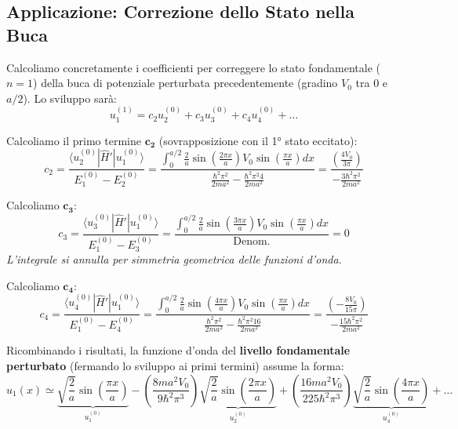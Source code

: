\documentclass[11pt, a4paper]{article}
\begin{document}
\subsection{Applicazione: Correzione dello Stato nella Buca} %

Calcoliamo concretamente i coefficienti per correggere lo stato fondamentale ($n=1$) della buca di potenziale perturbata precedentemente (gradino $V_0$ tra $0$ e $a/2$). %
Lo sviluppo sarà: %
\begin{equation*}
    u_1^{(1)} = c_2 u_2^{(0)} + c_3 u_3^{(0)} + c_4 u_4^{(0)} + \dots %
\end{equation*}

Calcoliamo il primo termine $\mathbf{c_2}$ (sovrapposizione con il 1° stato eccitato): %
\begin{equation*}
    c_2 = \frac{\langle u_2^{(0)} | \hat{H}' | u_1^{(0)} \rangle}{E_1^{(0)} - E_2^{(0)}} = \frac{ \int_0^{a/2} \frac{2}{a} \sin\left(\frac{2\pi x}{a}\right) V_0 \sin\left(\frac{\pi x}{a}\right) dx }{ \frac{\hbar^2 \pi^2}{2ma^2} - \frac{\hbar^2 \pi^2 4}{2ma^2} } = \frac{ \left( \frac{4V_0}{3\pi} \right) }{ - \frac{3\hbar^2 \pi^2}{2ma^2} } %
\end{equation*}

Calcoliamo $\mathbf{c_3}$: %
\begin{equation*}
    c_3 = \frac{\langle u_3^{(0)} | \hat{H}' | u_1^{(0)} \rangle}{E_1^{(0)} - E_3^{(0)}} = \frac{ \int_0^{a/2} \frac{2}{a} \sin\left(\frac{3\pi x}{a}\right) V_0 \sin\left(\frac{\pi x}{a}\right) dx }{ \text{Denom.} } = 0 %
\end{equation*}
\textit{L'integrale si annulla per simmetria geometrica delle funzioni d'onda.} %

Calcoliamo $\mathbf{c_4}$: %
\begin{equation*}
    c_4 = \frac{\langle u_4^{(0)} | \hat{H}' | u_1^{(0)} \rangle}{E_1^{(0)} - E_4^{(0)}} = \frac{ \int_0^{a/2} \frac{2}{a} \sin\left(\frac{4\pi x}{a}\right) V_0 \sin\left(\frac{\pi x}{a}\right) dx }{ \frac{\hbar^2 \pi^2}{2ma^2} - \frac{\hbar^2 \pi^2 16}{2ma^2} } = \frac{ \left( -\frac{8V_0}{15\pi} \right) }{ - \frac{15\hbar^2 \pi^2}{2ma^2} } %
\end{equation*}

\noindent
Ricombinando i risultati, la funzione d'onda del \textbf{livello fondamentale perturbato} (fermando lo sviluppo ai primi termini) assume la forma: %
\begin{equation}
    u_1(x) \simeq \underbrace{ \sqrt{\frac{2}{a}} \sin\left(\frac{\pi x}{a}\right) }_{u_1^{(0)}} - \left( \frac{8 m a^2 V_0}{9 \hbar^2 \pi^3} \right) \underbrace{ \sqrt{\frac{2}{a}} \sin\left(\frac{2\pi x}{a}\right) }_{u_2^{(0)}} + \left( \frac{16 m a^2 V_0}{225 \hbar^2 \pi^3} \right) \underbrace{ \sqrt{\frac{2}{a}} \sin\left(\frac{4\pi x}{a}\right) }_{u_4^{(0)}} + \dots %
\end{equation}
\end{document}
